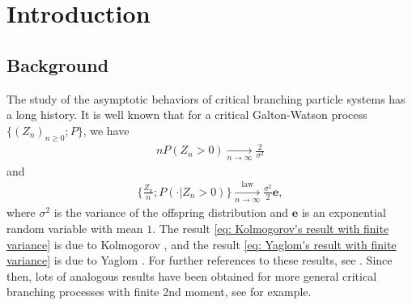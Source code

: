 \documentclass[12pt,a4paper]{amsart}
\theoremstyle{definition}
\numberwithin{equation}{section}
\begin{document}
\section{Introduction}
\subsection{Background}
The study of the asymptotic behaviors of critical branching particle systems has a long history.
It is well known that for a critical Galton-Watson process $\{(Z_n)_{n\geq 0}; P\}$, we have
\begin{align}\label{eq: Kolmogorov's result with finite variance}
	n P(Z_n > 0)
	\xrightarrow[n\to \infty]{} \frac{2}{\sigma^2}
\end{align}
and
\begin{align}\label{eq: Yaglom's result with finite variance}
	\Big\{ \frac{Z_n}{n}; P(\cdot| Z_n > 0) \Big\}
	\xrightarrow[n \to \infty]{\operatorname{law}} \frac{\sigma^2}{2} \mathbf e,
\end{align}
where $\sigma^2$ is the variance of the offspring distribution and $\mathbf e$ is an exponential random variable with mean $1$.
The result \eqref{eq: Kolmogorov's result with finite variance} is due to Kolmogorov \cite{Kolmogorov1938Zur-losung}, and the result \eqref{eq: Yaglom's result with finite variance} is due to Yaglom \cite{Yaglom1947Certain}.
For further references to these results, see \cite{Harris2002The-theory, KestenNeySpitzer1966The-Galton-Watson}.
Since then, lots of analogous results have been obtained for more general critical branching processes with finite 2nd moment, see \cite{AsmussenHering1983Branching, AthreyaNey1974Functionals, AthreyaNey1972Branching, JoffeSpitzer1967On-multitype} for example.
	
\end{document}
